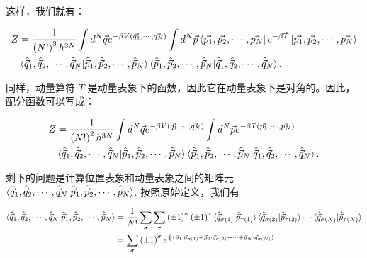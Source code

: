 这样，我们就有：
\begin{linenomath}\begin{equation}
    \begin{aligned}
            Z &= \frac{1}{\left( N! \right)^3h^{3N}} \int d^N\vec{q} e^{-\beta V(\vec{q_1},\cdots,\vec{q_N})} \int d^N\vec{p} \bra{\vec{p_1},\vec{p_2},\cdots, \vec{p_N}} e^{-\beta \hat{T}} \ket{\vec{p_1},\vec{p_2},\cdots, \vec{p_N}} 
            \\ &\braket{\hat{\vec{q}}_1,\hat{\vec{q}}_2,\cdots, \hat{\vec{q}}_N|\hat{\vec{p}}_1,\hat{\vec{p}}_2,\cdots, \hat{\vec{p}}_N} \braket{\hat{\vec{p}}_1,\hat{\vec{p}}_2,\cdots, \hat{\vec{p}}_N|\hat{\vec{q}}_1,\hat{\vec{q}}_2,\cdots, \hat{\vec{q}}_N}.
    \end{aligned}
\end{equation}\end{linenomath}
同样，动量算符 $\hat{T}$ 是动量表象下的函数，因此它在动量表象下是对角的。因此，配分函数可以写成：
\begin{linenomath}\begin{equation}
    \begin{aligned}
            Z &= \frac{1}{\left( N! \right)^2 h^{3N}} \int d^N\vec{q} e^{-\beta V(\vec{q_1},\cdots,\vec{q_N})} \int d^N\vec{p} e^{-\beta T(\vec{p_1},\cdots,\vec{p_N})} 
    \\ &\braket{\hat{\vec{q}}_1,\hat{\vec{q}}_2,\cdots, \hat{\vec{q}}_N|\hat{\vec{p}}_1,\hat{\vec{p}}_2,\cdots, \hat{\vec{p}}_N} \braket{\hat{\vec{p}}_1,\hat{\vec{p}}_2,\cdots, \hat{\vec{p}}_N|\hat{\vec{q}}_1,\hat{\vec{q}}_2,\cdots, \hat{\vec{q}}_N}.
    \end{aligned}
\end{equation}\end{linenomath}
剩下的问题是计算位置表象和动量表象之间的矩阵元 $\braket{\hat{\vec{q}}_1,\hat{\vec{q}}_2,\cdots, \hat{\vec{q}}_N|\hat{\vec{p}}_1,\hat{\vec{p}}_2,\cdots, \hat{\vec{p}}_N}$. 按照原始定义，我们有
\begin{linenomath}\begin{equation}
    \begin{aligned}
            \braket{\hat{\vec{q}}_1,\hat{\vec{q}}_2,\cdots, \hat{\vec{q}}_N|\hat{\vec{p}}_1,\hat{\vec{p}}_2,\cdots, \hat{\vec{p}}_N} &= \frac{1}{{N!}} \sum_{\sigma}\sum_{\tau}\left( \pm 1 \right)^\sigma\left( \pm 1 \right)^\tau \braket{\hat{\vec{q}}_{\sigma(1)}|\hat{\vec{p}}_{\tau(1)}} \braket{\hat{\vec{q}}_{\sigma(2)}|\hat{\vec{p}}_{\tau(2)}} \cdots \braket{\hat{\vec{q}}_{\sigma(N)}|\hat{\vec{p}}_{\tau(N)}}
            \\ &= \sum_{\sigma}\left( \pm 1 \right)^\sigma e^{\frac{i}{\hbar}(\vec{p}_1\cdot\vec{q}_{\sigma(1)} + \vec{p}_2\cdot\vec{q}_{\sigma(2)} + \cdots + \vec{p}_N\cdot\vec{q}_{\sigma(N)})}
    \end{aligned}
\end{equation}\end{linenomath}
